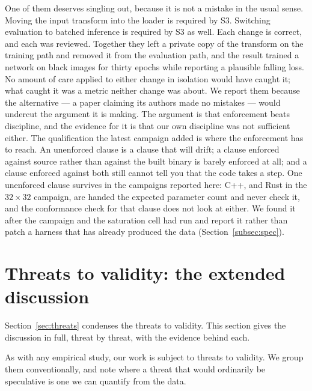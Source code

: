 One of them deserves singling out, because it is not a mistake in the usual
sense. Moving the input transform into the loader is required by S3. Switching
evaluation to batched inference is required by S3 as well. Each change is
correct, and each was reviewed. Together they left a private copy of the
transform on the training path and removed it from the evaluation path, and the
result trained a network on black images for thirty epochs while reporting a
plausible falling loss. No amount of care applied to either change in isolation
would have caught it; what caught it was a metric neither change was about. We report
them because the alternative --- a paper claiming its authors made no mistakes
--- would undercut the argument it is making. The argument is that enforcement
beats discipline, and the evidence for it is that our own discipline was not
sufficient either. The qualification the latest campaign added is where the enforcement has
to reach. An unenforced clause is a clause that will drift; a clause enforced
against source rather than against the built binary is barely enforced at all;
and a clause enforced against both still cannot tell you that the code takes a
step. One unenforced clause survives in the campaigns reported here: C++, and
Rust in the $32\times32$ campaign, are handed the expected parameter count and
never check it, and the conformance check for that clause does not look at
either. We found it after the campaign and the
saturation cell had run and report it rather than patch a harness that has already
produced the data (Section~\ref{subsec:spec}).

\FloatBarrier

\section{Threats to validity: the extended discussion}
\label{app:threats}

Section~\ref{sec:threats} condenses the threats to validity. This section gives
the discussion in full, threat by threat, with the evidence behind each.

As with any empirical study, our work is subject to threats to validity. We
group them conventionally, and note where a threat that would ordinarily be
speculative is one we can quantify from the data.

